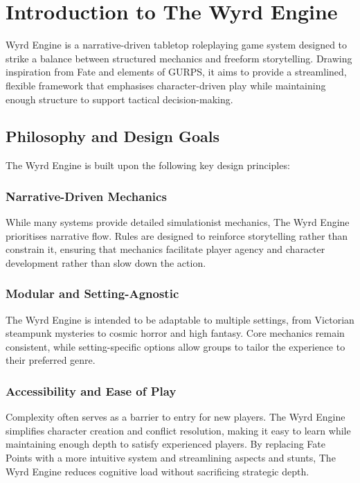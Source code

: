 
\chapter{Introduction to The Wyrd Engine}

 Wyrd Engine is a narrative-driven tabletop roleplaying game system designed to strike a balance between structured mechanics and freeform storytelling. Drawing inspiration from Fate and elements of GURPS, it aims to provide a streamlined, flexible framework that emphasises character-driven play while maintaining enough structure to support tactical decision-making.

\section{Philosophy and Design Goals}
The Wyrd Engine is built upon the following key design principles:

\subsection{Narrative-Driven Mechanics}
While many systems provide detailed simulationist mechanics, The Wyrd Engine prioritises narrative flow. Rules are designed to reinforce storytelling rather than constrain it, ensuring that mechanics facilitate player agency and character development rather than slow down the action.

\subsection{Modular and Setting-Agnostic}
The Wyrd Engine is intended to be adaptable to multiple settings, from Victorian steampunk mysteries to cosmic horror and high fantasy. Core mechanics remain consistent, while setting-specific options allow groups to tailor the experience to their preferred genre.

\subsection{Accessibility and Ease of Play}
Complexity often serves as a barrier to entry for new players. The Wyrd Engine simplifies character creation and conflict resolution, making it easy to learn while maintaining enough depth to satisfy experienced players. By replacing Fate Points with a more intuitive system and streamlining aspects and stunts, The Wyrd Engine reduces cognitive load without sacrificing strategic depth.

